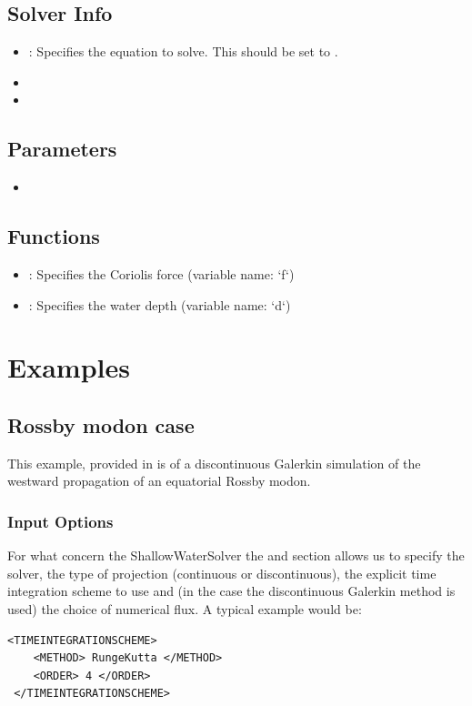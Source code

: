 \subsection{Solver Info}
\begin{itemize}
\item {}: Specifies the equation to solve. This should be set
to .
\item {}
\item {}
\end{itemize}

\subsection{Parameters}
\begin{itemize}
\item {}
\end{itemize}

\subsection{Functions}
\begin{itemize}
\item {}: Specifies the Coriolis force (variable name: `f`)
\item {}: Specifies the water depth (variable name: `d`)
\end{itemize}

\section{Examples}
\subsection{Rossby modon case}
This example, provided in  is of a
discontinuous Galerkin simulation of the westward propagation of an equatorial
Rossby modon.


\subsubsection{Input Options}

For what concern the ShallowWaterSolver the
 and  section
allows us to specify the solver, the type of projection (continuous or
discontinuous), the explicit time integration scheme to use and (in
the case the discontinuous Galerkin method is used) the choice of
numerical flux. A typical example would be:
\begin{lstlisting}[style=XmlStyle]
 <TIMEINTEGRATIONSCHEME>
    <METHOD> RungeKutta </METHOD>
    <ORDER> 4 </ORDER>
 </TIMEINTEGRATIONSCHEME>
\end{lstlisting}
    
